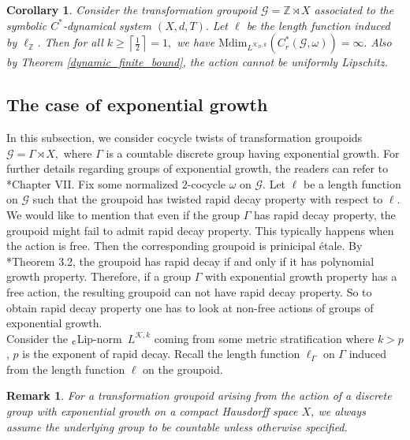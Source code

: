 \documentclass[a4paper,11pt,reqno]{amsart}
\theoremstyle{plain}
\newtheorem{cor}[thm]{Corollary}
\newtheorem{rem}[thm]{Remark}
\theoremstyle{mainthmstyle}
\theoremstyle{named}
\numberwithin{equation}{section}
\newcommand{\clipnorm}{$_{\text{\rm c}}$Lip-norm}
\begin{document}
\begin{cor}\label{dynamic_complexity}
Consider the transformation groupoid $\mathcal G = \mathbb Z \rtimes X$ associated to the symbolic $C^{\ast}$-dynamical system $(X, d, T).$ Let $\ell$ be the length function induced by $\ell_{\mathbb{Z}}$. Then for all $k \geq \left \lceil \frac{1}{2} \right \rceil = 1,$ we have 
$\mathrm {Mdim}_{L^{\mathcal K_D, k}} \left (C_r^{\ast} (\mathcal G, \omega) \right ) = \infty.$ Also by Theorem \ref{dynamic_finite_bound}, the action cannot be uniformly Lipschitz.
\end{cor}




\subsection{The case of exponential growth} In this subsection, we consider cocycle twists of transformation groupoids $\mathcal{G}=\Gamma \rtimes X,$ where $\Gamma$ is a countable discrete group having exponential growth. For further details regarding groups of exponential growth, the readers can refer to \cite{delaharpe}*{Chapter VII}. Fix some normalized $2$-cocycle $\omega$ on $\mathcal{G}$. Let $\ell$ be a length function on $\mathcal{G}$ such that the groupoid has twisted rapid decay property with respect to $\ell$. We would like to mention that even if the group $\Gamma$ has rapid decay property, the groupoid might fail to admit rapid decay property. This typically happens when the action is free. Then the corresponding groupoid is prinicipal étale. By \cite{Weygandt-2024-Rapid-decay-for-etale-gpd}*{Theorem 3.2}, the groupoid has rapid decay if and only if it has polynomial growth property. Therefore, if a group $\Gamma$ with exponential growth property has a free action, the resulting groupoid can not have rapid decay property. So to obtain rapid decay property one has to look at non-free actions of groups of exponential growth.\\
Consider the \clipnorm\ $L^{\mathcal{K},k}$ coming from some metric stratification where $k>p$, $p$ is the exponent of rapid decay. Recall the length function $\ell_{\Gamma}$ on $\Gamma$ induced from the length function $\ell$ on the groupoid.

\begin{rem}
For a transformation groupoid arising from the action of a discrete group with exponential growth on a compact Hausdorff space $X$, we always assume the underlying group to be countable unless otherwise specified.
\end{rem}
\end{document}
